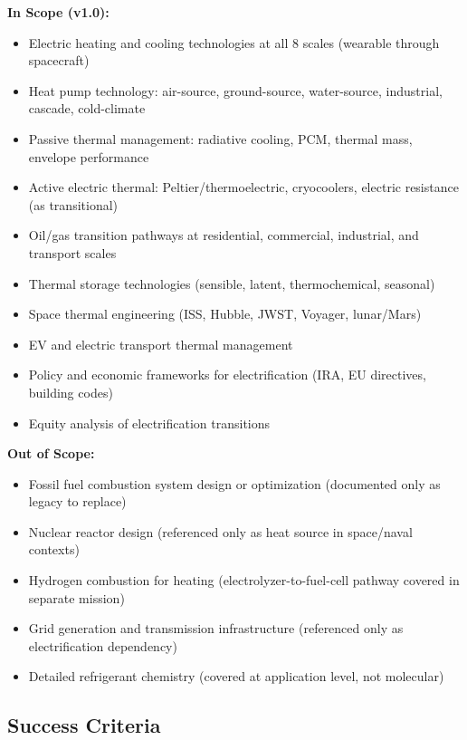 \documentclass[11pt,letterpaper]{article}
\begin{document}
\textbf{In Scope (v1.0):}
\begin{itemize}[leftmargin=2em]
\item Electric heating and cooling technologies at all 8 scales (wearable through spacecraft)
\item Heat pump technology: air-source, ground-source, water-source, industrial, cascade, cold-climate
\item Passive thermal management: radiative cooling, PCM, thermal mass, envelope performance
\item Active electric thermal: Peltier/thermoelectric, cryocoolers, electric resistance (as transitional)
\item Oil/gas transition pathways at residential, commercial, industrial, and transport scales
\item Thermal storage technologies (sensible, latent, thermochemical, seasonal)
\item Space thermal engineering (ISS, Hubble, JWST, Voyager, lunar/Mars)
\item EV and electric transport thermal management
\item Policy and economic frameworks for electrification (IRA, EU directives, building codes)
\item Equity analysis of electrification transitions
\end{itemize}

\textbf{Out of Scope:}
\begin{itemize}[leftmargin=2em]
\item Fossil fuel combustion system design or optimization (documented only as legacy to replace)
\item Nuclear reactor design (referenced only as heat source in space/naval contexts)
\item Hydrogen combustion for heating (electrolyzer-to-fuel-cell pathway covered in separate mission)
\item Grid generation and transmission infrastructure (referenced only as electrification dependency)
\item Detailed refrigerant chemistry (covered at application level, not molecular)
\end{itemize}

\subsection{Success Criteria}
\end{document}
